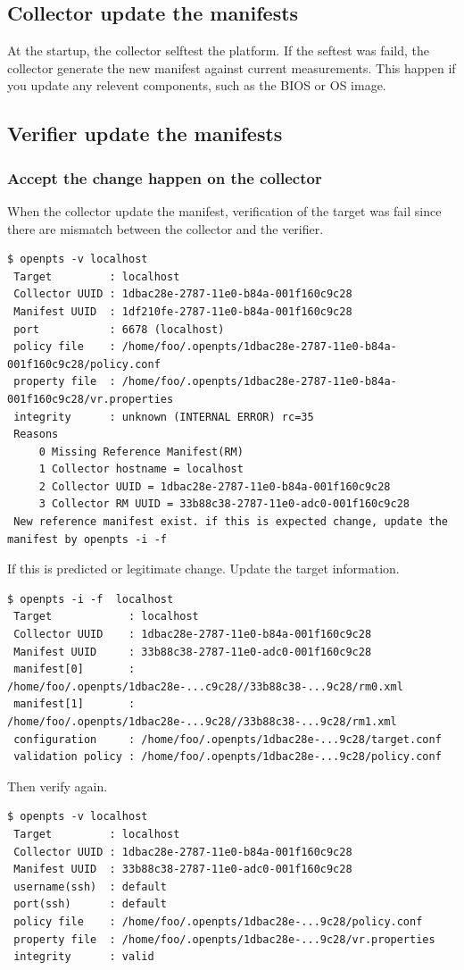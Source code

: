 

\subsection{Collector update the manifests} 


At the startup, the collector selftest the platform.
If the seftest was faild, the collector generate the new manifest against current measurements.
This happen if you update any relevent components, such as the BIOS or OS image.

\subsection{Verifier update the manifests} 

\subsubsection{Accept the change happen on the collector}

When the collector update the manifest, 
verification of the target was fail since there are mismatch between the collector and the verifier.
\begin{lstlisting}[style=console]
 $ openpts -v localhost
 Target         : localhost
 Collector UUID : 1dbac28e-2787-11e0-b84a-001f160c9c28
 Manifest UUID  : 1df210fe-2787-11e0-b84a-001f160c9c28
 port           : 6678 (localhost)
 policy file    : /home/foo/.openpts/1dbac28e-2787-11e0-b84a-001f160c9c28/policy.conf
 property file  : /home/foo/.openpts/1dbac28e-2787-11e0-b84a-001f160c9c28/vr.properties
 integrity      : unknown (INTERNAL ERROR) rc=35
 Reasons
     0 Missing Reference Manifest(RM)
     1 Collector hostname = localhost
     2 Collector UUID = 1dbac28e-2787-11e0-b84a-001f160c9c28
     3 Collector RM UUID = 33b88c38-2787-11e0-adc0-001f160c9c28
 New reference manifest exist. if this is expected change, update the manifest by openpts -i -f 
\end{lstlisting}
If this is predicted or legitimate change. Update the target information.
\begin{lstlisting}[style=console]
 $ openpts -i -f  localhost
 Target            : localhost
 Collector UUID    : 1dbac28e-2787-11e0-b84a-001f160c9c28
 Manifest UUID     : 33b88c38-2787-11e0-adc0-001f160c9c28
 manifest[0]       : /home/foo/.openpts/1dbac28e-...c9c28//33b88c38-...9c28/rm0.xml
 manifest[1]       : /home/foo/.openpts/1dbac28e-...9c28//33b88c38-...9c28/rm1.xml
 configuration     : /home/foo/.openpts/1dbac28e-...9c28/target.conf
 validation policy : /home/foo/.openpts/1dbac28e-...9c28/policy.conf
\end{lstlisting}
Then verify again.
\begin{lstlisting}[style=console]
 $ openpts -v localhost
 Target         : localhost
 Collector UUID : 1dbac28e-2787-11e0-b84a-001f160c9c28
 Manifest UUID  : 33b88c38-2787-11e0-adc0-001f160c9c28
 username(ssh)  : default
 port(ssh)      : default
 policy file    : /home/foo/.openpts/1dbac28e-...9c28/policy.conf
 property file  : /home/foo/.openpts/1dbac28e-...9c28/vr.properties
 integrity      : valid
\end{lstlisting}


